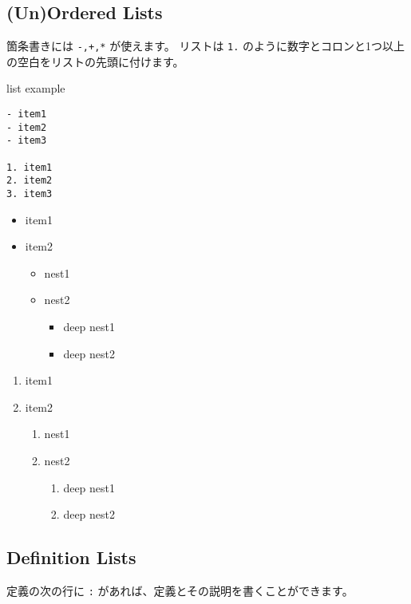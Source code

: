 \documentclass[a4j, titlepage]{jarticle}
\begin{document}
\subsection{(Un)Ordered Lists}

箇条書きには {\tt -,+,*} が使えます。
リストは {\tt 1.} のように数字とコロンと1つ以上の空白をリストの先頭に付けます。

\begin{itembox}[c]{list example}
\begin{verbatim}
- item1
- item2
- item3

1. item1
2. item2
3. item3
\end{verbatim}
\end{itembox}

\begin{itemize}
\item item1
\item item2


\begin{itemize}
\item nest1
\item nest2


\begin{itemize}
\item deep nest1
\item deep nest2
\end{itemize}
\end{itemize}
\end{itemize}

\begin{enumerate}
\item item1
\item item2


\begin{enumerate}
\item nest1
\item nest2


\begin{enumerate}
\item deep nest1
\item deep nest2
\end{enumerate}
\end{enumerate}
\end{enumerate}

\fi
\subsection{Definition Lists}

定義の次の行に {\tt :} があれば、定義とその説明を書くことができます。
\end{document}
